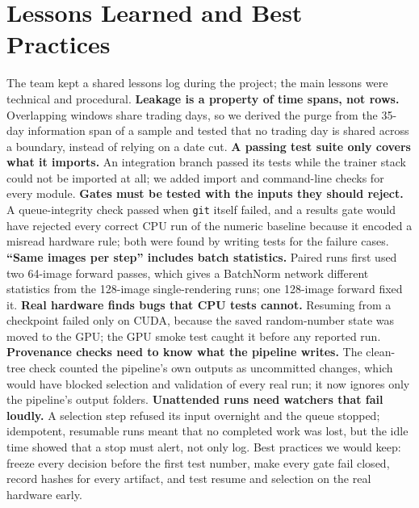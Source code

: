 \documentclass[10pt,journal,compsoc]{IEEEtran}
\begin{document}
\section{Lessons Learned and Best Practices}\label{sec:lessons}
The team kept a shared lessons log during the project; the main lessons were technical and procedural.
\textbf{Leakage is a property of time spans, not rows.} Overlapping windows share trading days, so we derived the purge from the 35-day information span of a sample and tested that no trading day is shared across a boundary, instead of relying on a date cut.
\textbf{A passing test suite only covers what it imports.} An integration branch passed its tests while the trainer stack could not be imported at all; we added import and command-line checks for every module.
\textbf{Gates must be tested with the inputs they should reject.} A queue-integrity check passed when \texttt{git} itself failed, and a results gate would have rejected every correct CPU run of the numeric baseline because it encoded a misread hardware rule; both were found by writing tests for the failure cases.
\textbf{``Same images per step'' includes batch statistics.} Paired runs first used two 64-image forward passes, which gives a BatchNorm network different statistics from the 128-image single-rendering runs; one 128-image forward fixed it.
\textbf{Real hardware finds bugs that CPU tests cannot.} Resuming from a checkpoint failed only on CUDA, because the saved random-number state was moved to the GPU; the GPU smoke test caught it before any reported run.
\textbf{Provenance checks need to know what the pipeline writes.} The clean-tree check counted the pipeline's own outputs as uncommitted changes, which would have blocked selection and validation of every real run; it now ignores only the pipeline's output folders.
\textbf{Unattended runs need watchers that fail loudly.} A selection step refused its input overnight and the queue stopped; idempotent, resumable runs meant that no completed work was lost, but the idle time showed that a stop must alert, not only log.
Best practices we would keep: freeze every decision before the first test number, make every gate fail closed, record hashes for every artifact, and test resume and selection on the real hardware early.
\end{document}
